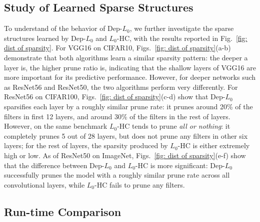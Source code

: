\documentclass[runningheads, envcountsame, a4paper]{llncs}
\begin{document}
\subsection{Study of Learned Sparse Structures}
To understand of the behavior of Dep-$L_0$, we further investigate the sparse structures learned by Dep-$L_0$ and $L_0$-HC, with the results reported in Fig.~\ref{fig: dist of sparsity}. For VGG16 on CIFAR10, Figs.~\ref{fig: dist of sparsity}(a-b) demonstrate that both algorithms learn a similar sparsity pattern: the deeper a layer is, the higher prune ratio is, indicating that the shallow layers of VGG16 are more important for its predictive performance. However, for deeper networks such as ResNet56 and ResNet50, the two algorithms perform very differently. For ResNet56 on CIFAR100, Figs.~\ref{fig: dist of sparsity}(c-d) show that Dep-$L_0$ sparsifies each layer by a roughly similar prune rate: it prunes around 20\% of the filters in first 12 layers, and around 30\% of the filters in the rest of layers. However, on the same benchmark $L_0$-HC tends to prune \textit{all or nothing}: it completely prunes 5 out of 28 layers, but does not prune any filters in other six layers; for the rest of layers, the sparsity produced by $L_0$-HC is either extremely high or low. As of ResNet50 on ImageNet, Figs.~\ref{fig: dist of sparsity}(e-f) show that the difference between Dep-$L_0$ and $L_0$-HC is more significant: Dep-$L_0$ successfully prunes the model with a roughly similar prune rate across all convolutional layers, while $L_0$-HC fails to prune any filters. 

\subsection{Run-time Comparison}
\end{document}
